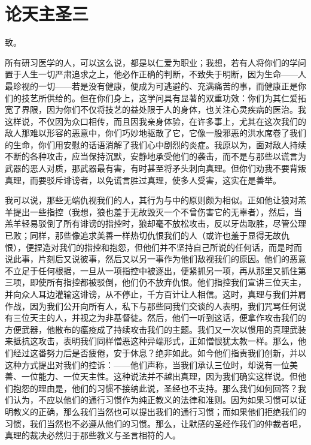 
\chapter{论天主圣三}


致。\par

所有研习医学的人，可以这么说，都是以仁爱为职业；我想，若有人将你们的学问置于人生一切严肃追求之上，他必作正确的判断，不致失于明断，因为生命——人最珍视的一切——若是没有健康，便成为可逃避的、充满痛苦的事，而健康正是你们的技艺所供给的。但在你们身上，这学问具有显著的双重功效：你们为其仁爱拓宽了界限，因为你们不仅将技艺的益处限于人的身体，也关注心灵疾病的医治。我这样说，不仅因为众口相传，而且因我亲身体验，在许多事上，尤其在这次我们的敌人那难以形容的恶意中，你们巧妙地驱散了它，它像一股邪恶的洪水席卷了我们的生命，你们用安慰的话语消解了我们心中剧烈的炎症。我原以为，面对敌人持续不断的各种攻击，应当保持沉默，安静地承受他们的袭击，而不是与那些以谎言为武器的恶人对质，那武器最有害，有时甚至将矛头刺向真理。但你们劝我不要背叛真理，而要驳斥诽谤者，以免谎言胜过真理，使多人受害，这实在是善举。\par

我可以说，那些无端仇视我们的人，其行为与中的原则颇为相似。正如他让狼对羔羊提出一些指控（我想，狼也羞于无故毁灭一个不曾伤害它的无辜者），然后，当羔羊轻易驳倒了所有诽谤的指控时，狼却毫不放松攻击，反以牙齿取胜，尽管公理已败；同样，那些像追求美善一样热切仇恨我们的人（或许也羞于显得无故仇恨），便捏造对我们的指控和抱怨，但他们并不坚持自己所说的任何话，而是时而说此事，片刻后又说彼事，然后又以另一事作为他们敌视我们的原因。他们的恶意不立足于任何根据，一旦从一项指控中被逐出，便紧抓另一项，再从那里又抓住第三项，即使所有指控都被驳倒，他们仍不放弃仇恨。他们指控我们宣讲三位天主，并向众人耳边灌输这诽谤，从不停止，千方百计让人相信。这时，真理与我们并肩作战，因为我们公开向所有人，私下与那些同我们交谈的人表明，我们咒骂任何说有三位天主的人，并视之为非基督徒。然后，他们一听到这话，便拿作攻击我们的方便武器，他散布的瘟疫成了持续攻击我们的主题。我们又一次以惯用的真理武装来抵抗这攻击，表明我们同样憎恶这种异端形式，正如憎恨犹太教一样。那么，他们经过这番努力后是否疲倦，安于休息？绝非如此。如今他们指责我们创新，并以这种方式提出对我们的控诉：——他们声称，当我们承认三位时，却说有一位美善、一位能力、一位天主性。这种说法并不越出真理，因为我们确实这样说。但他们抱怨的理由是，他们的习惯不接纳此说，圣经也不支持。那么我们如何回答？我们认为，不应以他们的通行习惯作为纯正教义的法律和准则。因为如果习惯可以证明教义的正确，那么我们当然也可以提出我们的通行习惯；而如果他们拒绝我们的习惯，我们当然也不必遵从他们的习惯。那么，让默感的圣经作我们的仲裁者吧，真理的裁决必然归于那些教义与圣言相符的人。\par

